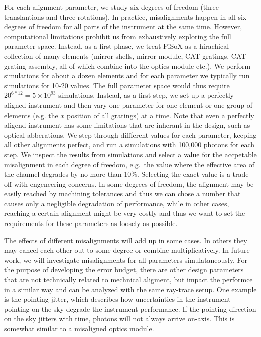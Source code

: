 \documentclass[]{spie}  %
\begin{document}
For each alignment parameter, we study six degrees of freedom (three
translantions and three rotations). In practice, misalignments happen
in all six degrees of freedom for all parts of the instrument at the
same time. However, computational limitations prohibit us from
exhaustively exploring the full parameter space. Instead, as a first
phase, we treat PiSoX as a hirachical collection of many elements
(mirror shells, mirror module, CAT gratings, CAT grating assembly, all
of which combine into the optics module etc.). We perform simulations
for about a dozen elements and for each parameter we typically run
simulations for 10-20 values. The full parameter space would thus
require $20^{6*12}=5\times 10^{93}$ simulations. Instead, as a first
step, we set up a perfectly aligned instrument and then vary one
parameter for one element or one group of elements (e.g. the $x$
position of all gratings) at a time. Note that even a perfectly
aligend instrument has some limitations that are inherant in the
design, such as optical abberations. We step through diffferent values
for each parameter, keeping all other alignments perfect, and run a
simulations with 100,000 photons for each step. We inspect the results
from simulations and select a value for the accpetable misalignment in
each degree of freedom, e.g.\ the value where the effective area of the
channel degrades by no more than 10\%. Selecting the exact value is a
trade-off with engeneering concerns. In some degrees of freedom, the
alignment may be easily reached by machining tolerances and thus we
can chose a number that causes only a negligible degradation of
performance, while in other cases, reaching a certain alignment might
be very costly and thus we want to set the requirements for these
parameters as loosely as possible.

The effects of different misalignments will add up in some cases. In others they may cancel each other out to some
degree or combine multiplicatively. In future work, we will
investigate misalignments for all parameters simulataneously.
For the purpose of developing the error budget, there are other design
parameters that are not technically related to mechnical aligment, but
impact the performce in a similar way and can be analyzed with the
same ray-trace setup. One example is the pointing jitter, which
describes how uncertainties in the instrument pointing on the sky
degrade the instrument performance. If the pointing direction on the
sky jitters with time, photons will not always arrive on-axis. This is
somewhat similar to a misaligned optics module.
\end{document}
